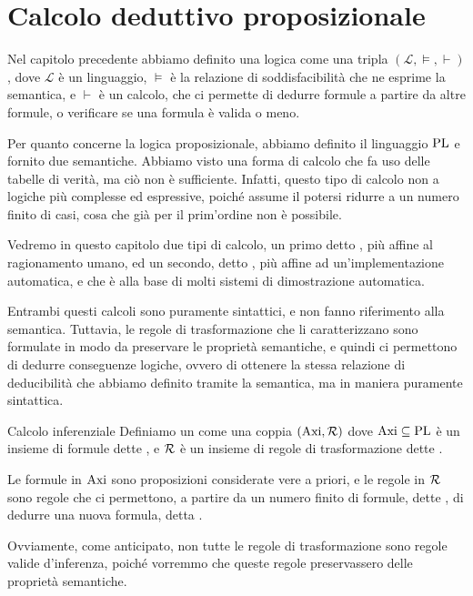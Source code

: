 \chapter{Calcolo deduttivo proposizionale}

Nel capitolo precedente abbiamo definito una logica come una tripla \((\mathcal{L}, \models, \vdash)\), dove \(\mathcal{L}\) è un linguaggio, \(\models\) è la relazione di soddisfacibilità che ne esprime la semantica, e \(\vdash\) è un calcolo, che ci permette di dedurre formule a partire da altre formule, o verificare se una formula è valida o meno.

Per quanto concerne la logica proposizionale, abbiamo definito il linguaggio \(\operatorname{PL}\) e fornito due semantiche. 
Abbiamo visto una forma di calcolo che fa uso delle tabelle di verità, ma ciò non è sufficiente.
Infatti, questo tipo di calcolo non  a logiche più complesse ed espressive, poiché assume il potersi ridurre a un numero finito di casi, cosa che già per il prim'ordine non è possibile.

Vedremo in questo capitolo due tipi di calcolo, un primo detto , più affine al ragionamento umano, ed un secondo, detto , più affine ad un'implementazione automatica, e che è alla base di molti sistemi di dimostrazione automatica.

Entrambi questi calcoli sono puramente sintattici, e non fanno riferimento alla semantica. 
Tuttavia, le regole di trasformazione che li caratterizzano sono formulate in modo da preservare le proprietà semantiche, e quindi ci permettono di dedurre conseguenze logiche, ovvero di ottenere la stessa relazione di deducibilità che abbiamo definito tramite la semantica, ma in maniera puramente sintattica.

\begin{definition}{Calcolo inferenziale}
  Definiamo un  come una coppia \((\operatorname{Axi}, \mathcal{R})\) dove \(\operatorname{Axi} \subseteq \operatorname{PL}\) è un insieme di formule dette , e \(\mathcal{R}\) è un insieme di regole di trasformazione dette .

  Le formule in \(\operatorname{Axi}\) sono proposizioni considerate vere a priori, e le regole in \(\mathcal{R}\) sono regole che ci permettono, a partire da un numero finito di formule, dette , di dedurre una nuova formula, detta .
\end{definition}

Ovviamente, come anticipato, non tutte le regole di trasformazione sono regole valide d'inferenza, poiché vorremmo che queste regole preservassero delle proprietà semantiche.

